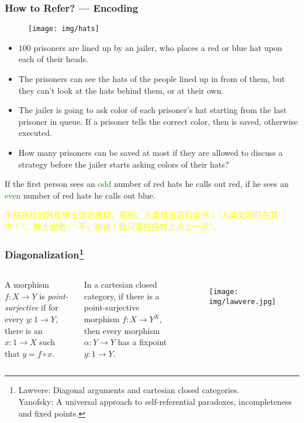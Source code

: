 \documentclass[UTF8,11pt,colorlinks,compress,openany]{beamer}%
\begin{document}
\begin{frame}\frametitle{How to Refer? --- Encoding}
	\begin{figure}
		\centering \texttt{[image: img/hats]}
	\end{figure}
	\begin{itemize}
		\item $100$ prisoners are lined up by an jailer, who places a red or blue hat upon each of their heads.
		\item The prisoners can see the hats of the people lined up in from of them, but they can't look at the hats behind them, or at their own.
		\item The jailer is going to ask color of each prisoner's hat starting from the last prisoner in queue. If a prisoner tells the correct color, then is saved, otherwise executed.
		\item How many prisoners can be saved at most if they are allowed to discuss a strategy before the jailer starts asking colors of their hats?
	\end{itemize}
	\begin{block}{}
		If the first person sees an \textcolor{green}{odd} number of red hats he calls out red, if he sees an \textcolor{green}{even} number of red hats he calls out blue.
	\end{block}
\begin{block}{}
\small \textcolor{yellow}{手扶拐杖的外星绅士造访地球。临别，人类赠送百科全书：“人类文明尽在其中！”。绅士谢绝：“不，谢谢！我只需在拐杖上点上一点”。}
\end{block}
\end{frame}

\begin{frame}\frametitle{Diagonalization\footnote{\tiny Lawvere: Diagonal arguments and cartesian closed categories.\\
Yanofsky: A universal approach to self-referential paradoxes, incompleteness and fixed points.}}
\setlength\abovedisplayskip{0pt}
\setlength\belowdisplayskip{0pt}
\begin{columns}
\begin{definition}
A morphism $f: X\to Y$ is \emph{point-surjective} if for every $y: 1\to Y$, there is an $x: 1\to X$ such that $y=f\circ x$.
\end{definition}
	\begin{theorem}
		In a cartesian closed category, if there is a point-surjective morphism $f: X\to Y^X$, then every morphism $\alpha: Y\to Y$ has a fixpoint $y: 1\to Y$.
	\end{theorem}
	\begin{figure}
		\texttt{[image: img/lawvere.jpg]}
	\end{figure}
\end{columns}
\end{frame}
\end{document}
